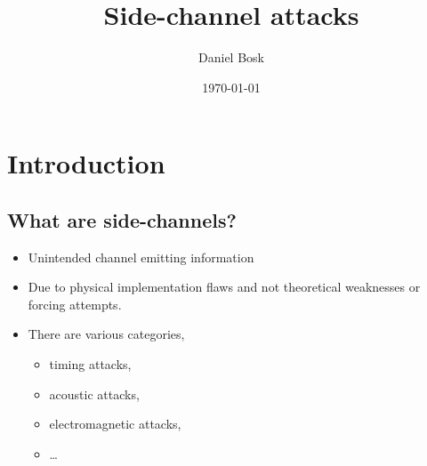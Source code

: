 \title{%
  Side-channel attacks
}
\author{Daniel Bosk}
\date{\today}


\begin{frame}
  \maketitle{}
\end{frame}





\section{Introduction}

\subsection{What are side-channels?}

\begin{frame}
  \begin{definition}
    \begin{itemize}
      \item Unintended channel emitting information
      \item Due to physical implementation flaws and not theoretical weaknesses 
        or forcing attempts.
    \end{itemize}
  \end{definition}
\end{frame}

\begin{frame}
  \begin{itemize}
    \item There are various categories, \eg
      \begin{itemize}
        \item timing attacks,
        \item acoustic attacks,
        \item electromagnetic attacks,
        \item \dots
      \end{itemize}
  \end{itemize}
\end{frame}


